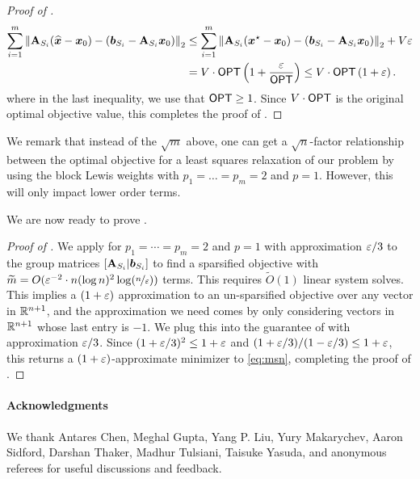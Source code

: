 \documentclass[11pt]{article}
\numberwithin{equation}{section}
\begin{document}
\begin{proof}[Proof of ]
\begin{align*}
    \sum_{i=1}^m \left\lVert \mathbf{A}_{S_i}(\widehat{\bm{x}}-\bm{x}_0)-(\bm{b}_{S_i}-\mathbf{A}_{S_i} \bm{x}_0) \right\rVert_2 &\le \sum_{i=1}^m \left\lVert \mathbf{A}_{S_i}(\bm{x}^{\star}-\bm{x}_0)-(\bm{b}_{S_i}-\mathbf{A}_{S_i} \bm{x}_0) \right\rVert_2 + V\varepsilon \\
    &= V \cdot \mathsf{OPT}\left(1+\frac{\varepsilon}{\mathsf{OPT}}\right) \le V \cdot \mathsf{OPT}\left(1+\varepsilon\right).
\end{align*}
where in the last inequality, we use that \(\mathsf{OPT} \ge 1\).
Since $V \cdot \mathsf{OPT}$ is the original optimal objective value, this completes the proof of .
\end{proof}

We remark that instead of the $\sqrt{m}$ above, one can get a $\sqrt{n}$-factor relationship between the optimal objective for a least squares relaxation of our problem by using the block Lewis weights with $p_1=\dots=p_m=2$ and $p=1$. However, this will only impact lower order terms.

We are now ready to prove .

\begin{proof}[Proof of ]
We apply  for \(p_1 = \cdots = p_m = 2\) and \(p = 1\) with approximation $\varepsilon/3$ to the group matrices $\left[\mathbf{A}_{S_i} \vert \bm{b}_{S_i}\right]$ to find a sparsified objective
with \(\widetilde{m} = O(\varepsilon^{-2} \cdot n(\log n)^2 \log(\nicefrac{n}{\varepsilon}))\) terms.
This requires \(\widetilde{O}(1)\) linear system solves.
This implies a \((1+\varepsilon)\) approximation to an un-sparsified objective over any vector in \(\mathbb{R}^{n+1}\),
and the approximation we need comes by only considering vectors in \(\mathbb{R}^{n+1}\) whose last entry is \(-1\).
We plug this into the guarantee of  with approximation $\varepsilon/3$. Since $(1+\varepsilon/3)^2 \le 1+\varepsilon$ and $(1+\varepsilon/3)/(1-\varepsilon/3) \le 1+\varepsilon$, this returns a $(1+\varepsilon)$-approximate minimizer to \eqref{eq:msn}, completing the proof of .
\end{proof}

\paragraph{Acknowledgments} We thank Antares Chen, Meghal Gupta, Yang P. Liu, Yury Makarychev, Aaron Sidford, Darshan Thaker, Madhur Tulsiani, Taisuke Yasuda, and anonymous referees for useful discussions and feedback.

\printbibliography

\appendix


\end{document}
